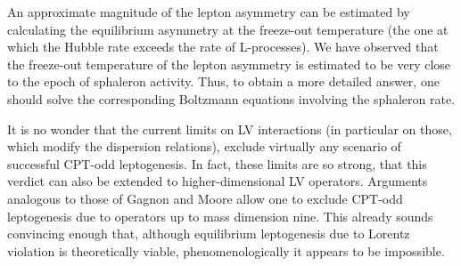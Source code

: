 \documentclass[12pt]{revtex4}
\begin{document}
	An approximate magnitude of the lepton asymmetry can be estimated by calculating
	the equilibrium asymmetry at the freeze-out temperature (the one at which the
	Hubble rate exceeds the rate of L-processes).
	We have observed that the freeze-out temperature of the lepton asymmetry is
	estimated to be very close to the epoch of sphaleron activity.
	Thus, to obtain a more detailed answer, one should solve the corresponding 
	Boltzmann equations involving the sphaleron rate.

	It is no wonder that the current limits on LV interactions (in particular on those,
	which modify the dispersion relations), exclude virtually any scenario of successful
	CPT-odd leptogenesis.
	In fact, these limits are so strong, that this verdict can also be extended to 
	higher-dimensional LV operators.
	Arguments analogous to those of Gagnon and Moore allow one to exclude CPT-odd
	leptogenesis due to operators up to mass dimension nine.
	This already sounds convincing enough that, although equilibrium leptogenesis
	due to Lorentz violation is theoretically viable, phenomenologically it appears
	to be impossible.
\end{document}
